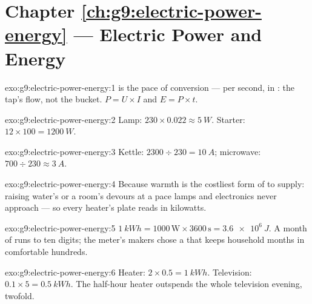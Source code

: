 \section*{Chapter \ref{ch:g9:electric-power-energy} --- Electric Power and Energy}

\begin{solution}{exo:g9:electric-power-energy:1}
 is the pace of  conversion ---  per second,
in : the tap's flow, not the bucket. $P = U \times I$
and $E = P \times t$.
\end{solution}

\begin{solution}{exo:g9:electric-power-energy:2}
Lamp: $230 \times 0.022 \approx \qty{5}{W}$. Starter: $12
\times 100 = \qty{1200}{W}$.
\end{solution}

\begin{solution}{exo:g9:electric-power-energy:3}
Kettle: $2300 \div 230 = \qty{10}{A}$; microwave: $700 \div
230 \approx \qty{3}{A}$.
\end{solution}

\begin{solution}{exo:g9:electric-power-energy:4}
Because warmth is the costliest form of  to supply: raising
water's or a room's  devours  at a pace
lamps and electronics never approach --- so every heater's
plate reads in kilowatts.
\end{solution}

\begin{solution}{exo:g9:electric-power-energy:5}
$\qty{1}{kWh} = 1000 \, \text{W} \times 3600 \, \text{s} =
\qty{3.6e6}{J}$. A month of  runs to ten digits; the
meter's makers chose a  that keeps household months in
comfortable hundreds.
\end{solution}

\begin{solution}{exo:g9:electric-power-energy:6}
Heater: $2 \times 0.5 = \qty{1}{kWh}$. Television: $0.1
\times 5 = \qty{0.5}{kWh}$. The half-hour heater outspends
the whole television evening, twofold.
\end{solution}

